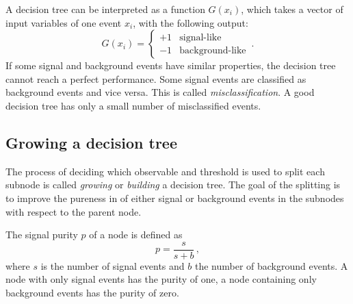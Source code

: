 A decision tree can be interpreted as a function $G(x_i)$, which takes a vector of input variables of one event $x_i$, with
the following output:
\begin{equation}
    \label{eq:dt}
    G(x_i) =
    \begin{cases}
        +1 & \text{signal-like} \\
        -1 & \text{background-like}
    \end{cases} \,.
\end{equation}
If some signal and background events have similar properties, the decision tree cannot reach a perfect performance.
Some signal events are classified as background events and vice versa.
This is called \emph{misclassification}.
A good decision tree has only a small number of misclassified events.

\subsection{Growing a decision tree}\label{sub:bdt:dt:growing}

The process of deciding which observable and threshold is used to split each subnode
is called \emph{growing} or \emph{building} a decision tree.
The goal of the splitting is to improve the pureness in of either signal or background events in the subnodes with respect to the parent node.

The signal purity $p$ of a node is defined as
\begin{equation}
    \label{eq:purity}
    p = \frac{s}{s+b}\,,
\end{equation}
where $s$ is the number of signal events and $b$ the number of background events.
A node with only signal events has the purity of one, a node containing only background events has the purity of zero.

